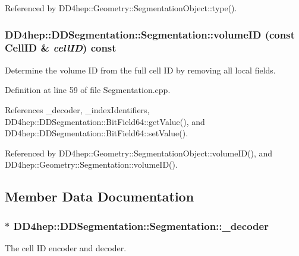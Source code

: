 Referenced by DD4hep::Geometry::SegmentationObject::type().\hypertarget{class_d_d4hep_1_1_d_d_segmentation_1_1_segmentation_a00b309f8094c1831dcd32317959d5071}{
\subsubsection[{volumeID}]{ DD4hep::DDSegmentation::Segmentation::volumeID (const {\bf CellID} \& {\em cellID}) const}}
\label{class_d_d4hep_1_1_d_d_segmentation_1_1_segmentation_a00b309f8094c1831dcd32317959d5071}


Determine the volume ID from the full cell ID by removing all local fields. 

Definition at line 59 of file Segmentation.cpp.

References \_\-decoder, \_\-indexIdentifiers, DD4hep::DDSegmentation::BitField64::getValue(), and DD4hep::DDSegmentation::BitField64::setValue().

Referenced by DD4hep::Geometry::SegmentationObject::volumeID(), and DD4hep::Geometry::Segmentation::volumeID().

\subsection{Member Data Documentation}
\hypertarget{class_d_d4hep_1_1_d_d_segmentation_1_1_segmentation_a48d782572ff008ea0f05c869526735f4}{
\subsubsection[{\_\-decoder}]{$\ast$ {\bf DD4hep::DDSegmentation::Segmentation::\_\-decoder}}}
\label{class_d_d4hep_1_1_d_d_segmentation_1_1_segmentation_a48d782572ff008ea0f05c869526735f4}


The cell ID encoder and decoder. 

